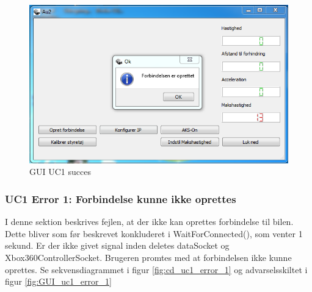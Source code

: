 \begin{figure}[H]
\centering
\includegraphics[width=\textwidth* 3/4,height=\textwidth* 9/20 ]{../fig/billeder/gui_uc1_success.png}
\caption{GUI UC1 succes}
\label{fig:GUI_uc1_success}
\end{figure}


\subsubsection{UC1 Error 1: Forbindelse kunne ikke oprettes}
I denne sektion beskrives fejlen, at der ikke kan oprettes forbindelse til bilen. Dette bliver som før beskrevet konkluderet i WaitForConnected(), som venter 1 sekund. Er der ikke givet signal inden deletes dataSocket og Xbox360ControllerSocket. Brugeren promtes med at forbindelsen ikke kunne oprettes. Se sekvensdiagrammet i figur \ref{fig:cd_uc1_error_1} og advarselsskiltet i figur \ref{fig:GUI_uc1_error_1}

